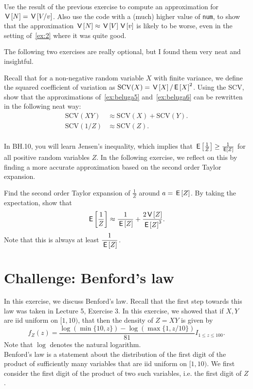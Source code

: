 \begin{exercise} Use the result of the previous exercise to compute an approximation for $\,\mathsf{V}\left[N\right]  = \,\mathsf{V}\left[V/v\right]$. Also use the code with a (much) higher value of \texttt{num}, to show that the approximation $\,\mathsf{V}\left[N\right]  \approx \,\mathsf{V}\left[V\right] \,\mathsf{V}\left[v\right]$ is likely to be worse, even in the setting of~\cref{ex:2} where it was quite good.
\end{exercise}

The following two exercises are really optional, but I found them very neat and insightful.



\begin{exercise}
Recall that for a non-negative random variable $X$ with finite variance, we define the squared coefficient of variation as $ \mathrm{SCV}(X) = \,\mathsf{V}\left[X\right] /\,\mathsf{E}\left[X\right]^2$.
Using the SCV, show that the approximations of~\cref{ex:beluga5} and~\cref{ex:beluga6} can be rewritten in the following neat way:
\begin{align*}
\mathrm{SCV}(XY) &\approx \mathrm{SCV}(X) + \mathrm{SCV}(Y). \\
\mathrm{SCV}\left(1/Z \right) &\approx \mathrm{SCV}(Z). \\
\end{align*}
\end{exercise}


In BH.10, you will learn Jensen's inequality, which implies that $\,\mathsf{E}\left[\frac{1}{Z}\right] \geq \frac{1}{\,\mathsf{E}\left[Z\right]}$ for all positive random variables $Z$. In the following exercise, we reflect on this by finding a more accurate approximation based on the second order Taylor expansion.

\begin{exercise} Find the second order Taylor expansion of $\frac{1}{Z}$ around $a=  \,\mathsf{E}\left[Z\right]$.
By taking the expectation, show that
\begin{align*}
\,\mathsf{E}\left[\frac{1}{Z}\right] \approx \frac{1}{\,\mathsf{E}\left[Z\right]} + \frac{2\,\mathsf{V}\left[Z\right]}{\,\mathsf{E}\left[Z\right]^3}.
\end{align*}
Note that this is always at least $\dfrac{1}{\,\mathsf{E}\left[Z\right]}$.
\end{exercise}


\section{Challenge: Benford's law}



In this exercise, we discuss Benford's law. Recall that the first step towards this law was taken in Lecture 5, Exercise 3. In this exercise, we showed that if $X,Y$ are iid uniform on $[1, 10)$, that then the density of $Z = XY$ is given by $$f_Z(z) = \frac{\log(\min\{10,z\}) - \log(\max\{1, z/10\})}{81} I_{1 \leq z \leq 100}.$$
Note that $\log$ denotes the natural logarithm. \\
Benford's law is a statement about the distribution of the first digit of the product of sufficiently many variables that are iid uniform on $[1, 10)$. We first consider the first digit of the product of two such variables, i.e. the first digit of $Z$.


